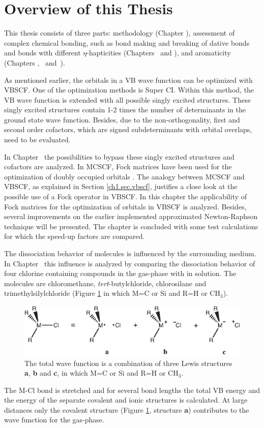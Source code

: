 \section{Overview of this Thesis}

This thesis consists of three parts: methodology (Chapter \chorbopt), assessment of complex chemical bonding, such as bond making and breaking of dative bonds and bonds with different $\eta$-hapticities (Chapters \chdissociation\ and \chcyclopentadienyl), and aromaticity (Chapters \chhuckel, \chinorganic\ and~\chindacene).

As mentioned earlier, the orbitals in a VB wave function can be optimized with \mbox{VBSCF}. One of the optimization methods is Super CI. Within this method, the VB wave function is extended with all possible singly excited structures. These singly excited structures contain 1-2 times the number of determinants in the ground state wave function. Besides, due to the non-orthogonality, first and second order cofactors, which are signed subdeterminants with orbital overlaps, need to be evaluated.

In Chapter \chorbopt\ the possibilities to bypass these singly excited structures and cofactors are analyzed. In MCSCF, Fock matrices have been used for the optimization of doubly occupied orbitals \cite{roos1,roos2}. The analogy between MCSCF and VBSCF, as explained in Section \ref{ch1.sec.vbscf}, justifies a close look at the possible use of a Fock operator in VBSCF. In this chapter the applicability of Fock matrices for the optimization of orbitals in VBSCF is analyzed. Besides, several improvements on the earlier implemented approximated Newton-Raphson technique \cite{koos1} will be presented. The chapter is concluded with some test calculations for which the speed-up factors are compared.

The dissociation behavior of molecules is influenced by the surrounding medium. In Chapter \chdissociation\ this influence is analyzed by comparing the dissociation behavior of four chlorine containing compounds in the gas-phase with in solution. The molecules are chloromethane, \textit{tert}-butylchloride, chlorosilane and trimethylsilylchloride (Figure \ref{ch1.fig.structures1} in which M=C or Si and R=H or CH$_3$).
\begin{figure}[htbp]
\center
\includegraphics{introduction/figures/structures.eps}
\caption{The total wave function is a combination of three Lewis structures \textbf{a}, \textbf{b} and \textbf{c}, in which M=C or Si and R=H or CH$_3$.}
\label{ch1.fig.structures1}
\end{figure}
The M-Cl bond  is stretched and for several bond lengths the total VB energy and the energy of the separate covalent and ionic structures is calculated. At large distances only the covalent structure (Figure \ref{ch1.fig.structures1}, structure \textbf{a}) contributes to the wave function for the gas-phase. 
 
